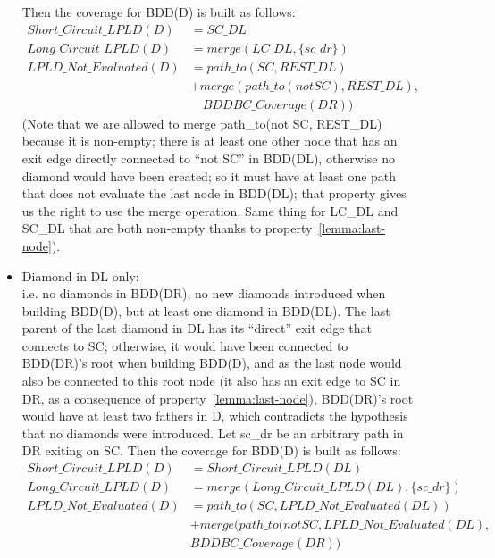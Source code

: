 \documentclass[a4paper,12pt,twoside]{article}
\begin{document}
\begin{description}
\begin{itemize}
    Then the coverage for BDD(D) is built as follows:
    \begin{align*}
    Short\_Circuit\_LPLD(D) & = SC\_DL\\
    Long\_Circuit\_LPLD(D)  & = merge(LC\_DL, \{sc\_dr\})\\
    LPLD\_Not\_Evaluated(D) & = path\_to(SC, REST\_DL)\\
                            & + merge(path\_to(not SC), REST\_DL),\\
                            & \quad BDDBC\_Coverage(DR))
    \end{align*}
    (Note that we are allowed to merge path\_to(not SC, REST\_DL) because
    it is non-empty; there is at least one other node that has an exit
    edge directly connected to ``not SC'' in BDD(DL), otherwise no
    diamond would have been created; so it must have at least one path
    that does not evaluate the last node in BDD(DL); that property
    gives us the right to use the merge operation. Same thing for LC\_DL
    and SC\_DL that are both non-empty thanks to
    property~\ref{lemma:last-node}).

  \item Diamond in DL only:\\
    i.e. no diamonds in BDD(DR), no new diamonds introduced when
    building BDD(D), but at least one diamond in BDD(DL).  The last
    parent of the last diamond in DL has its ``direct'' exit edge
    that connects to SC; otherwise, it would have been connected to
    BDD(DR)'s root when building BDD(D), and as the last node would
    also be connected to this root node (it also has an exit edge to
    SC in DR, as a consequence of property~\ref{lemma:last-node}), BDD(DR)'s
    root would have at least two fathers in D, which contradicts the
    hypothesis that no diamonds were introduced.  Let sc\_dr be an
    arbitrary path in DR exiting on SC.  Then the coverage for BDD(D)
    is built as follows:
    \begin{align*}
    Short\_Circuit\_LPLD(D) & = Short\_Circuit\_LPLD(DL)\\
    Long\_Circuit\_LPLD(D)  & = merge(Long\_Circuit\_LPLD(DL), \{sc\_dr\})\\
    LPLD\_Not\_Evaluated(D) & = path\_to(SC, LPLD\_Not\_Evaluated(DL))\\
                         & + merge(path\_to(not SC, LPLD\_Not\_Evaluated(DL),\\
                         & BDDBC\_Coverage(DR))
    \end{align*}
  \end{itemize}
\end{description}
\end{document}
